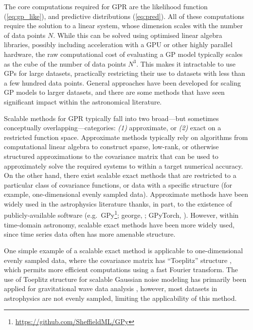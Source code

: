 \documentclass[letterpaper]{ar-1col}
\newcommand{\project}[1]{\textsf{#1}}
\begin{document}
The core computations required for GPR are the likelihood function (\autoref{eq:gp_like}), and predictive distributions (\autoref{eq:pred}).
All of these computations require the solution to a linear system, whose dimension scales with the number of data points $N$.
While this can be solved using optimised linear algebra libraries, possibly including acceleration with a GPU or other highly parallel hardware, the raw computational cost of evaluating a GP model typically scales as the cube of the number of data points $N^3$.
This makes it intractable to use GPs for large datasets, practically restricting their use to datasets with less than a few hundred data points.
General approaches have been developed for scaling GP models to larger datasets, and there are some methods that have seen significant impact within the astronomical literature.

Scalable methods for GPR typically fall into two broad---but sometimes conceptually overlapping---categories: \emph{(1)} approximate, or \emph{(2)} exact on a restricted function space.
Approximate methods typically rely on algorithms from computational linear algebra to construct sparse, low-rank, or otherwise structured approximations to the covariance matrix that can be used to approximately solve the required systems to within a target numerical accuracy.
On the other hand, there exist scalable exact methods that are restricted to a particular class of covariance functions, or data with a specific structure (for example, one-dimensional evenly sampled data).
Approximate methods \citep[e.g.,][]{inducing, george, kissgp, 2015arXiv151101870W} have been widely used in the astrophysics literature thanks, in part, to the existence of publicly-available software (e.g.\ \project{GPy}\footnote{\url{https://github.com/SheffieldML/GPy}}; \project{george}, \citealt{george}; \project{GPyTorch}, \citealt{gpytorch}).
However, within time-domain astronomy, scalable exact methods have been more widely used, since time series data often has more amenable structure.

One simple example of a scalable exact method is applicable to one-dimensional evenly sampled data, where the covariance matrix has ``Toeplitz'' structure \citep[e.g.,][]{toeplitz}, which permits more efficient computations using a fast Fourier transform.
The use of Toeplitz structure for scalable Gaussian noise modeling has primarily been applied for gravitational wave data analysis \citep[e.g.,][]{2020PhRvR...2d3298T, 2021arXiv210705609I}, however, most datasets in astrophysics are not evenly sampled, limiting the applicability of this method.
\end{document}

